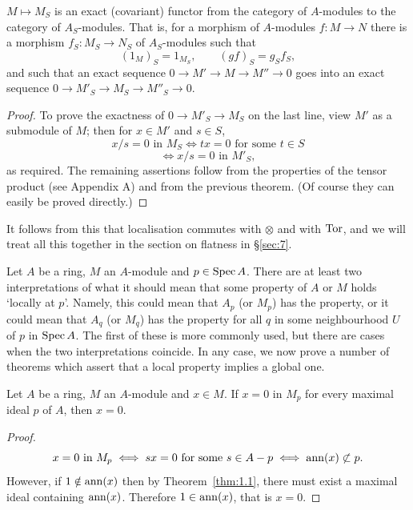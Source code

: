 \begin{theorem}\label{thm:4.5}
$M \mapsto M_S$ is an exact (covariant) functor from the category
of $A$-modules to the category of $A_S$-modules. That is, for a morphism of
$A$-modules $f\colon M \to N$ there is a morphism $f_S\colon M_S \to N_S$ of $A_S$-modules
such that
\[
  (1_M)_S = 1_{M_S}, \qquad (gf)_S = g_S f_S,
\]
and such that an exact sequence $0 \to M' \to M \to M'' \to 0$ goes into an
exact sequence $0 \to M'_S \to M_S \to M''_S \to 0$.
\end{theorem}

\begin{proof}
To prove the exactness of $0 \to M'_S \to M_S$ on the last line, view $M'$
as a submodule of $M$; then for $x \in M'$ and $s \in S$,
\[
  x/s = 0 \text{ in } M_S \iff tx = 0 \text{ for some } t \in S
\]
\[
  \iff x/s = 0 \text{ in } M'_S,
\]
as required. The remaining assertions follow from the properties of the
tensor product (see Appendix A) and from the previous theorem. (Of
course they can easily be proved directly.)
\end{proof}

It follows from this that localisation commutes with $\otimes$ and with $\operatorname{Tor}$,
and we will treat all this together in the section on flatness in \S\ref{sec:7}.

Let $A$ be a ring, $M$ an $A$-module and $p \in \operatorname{Spec} A$. There are at least
two interpretations of what it should mean that some property of $A$ or $M$
holds `locally at $p$'. Namely, this could mean that $A_p$ (or $M_p$) has the
property, or it could mean that $A_q$ (or $M_q$) has the property for all $q$ in
some neighbourhood $U$ of $p$ in $\operatorname{Spec} A$. The first of these is more commonly
used, but there are cases when the two interpretations coincide. In any
case, we now prove a number of theorems which assert that a local property
implies a global one.

\begin{theorem}\label{thm:4.6}
Let $A$ be a ring, $M$ an $A$-module and $x \in M$. If $x = 0$ in $M_p$
for every maximal ideal $p$ of $A$, then $x = 0$.
\end{theorem}

\begin{proof}
\[
  x = 0 \text{ in } M_p \iff sx = 0 \text{ for some } s \in A - p \iff \operatorname{ann}(x) \not\subset p.
\]
However, if $1 \notin \operatorname{ann}(x)$ then by Theorem~\ref{thm:1.1}, there must exist a maximal
ideal containing $\operatorname{ann}(x)$. Therefore $1 \in \operatorname{ann}(x)$, that is $x = 0$.
\end{proof}

